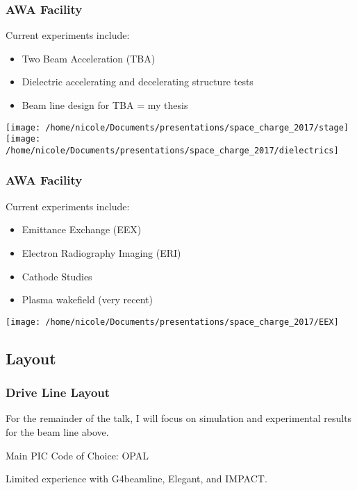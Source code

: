 \documentclass[professionalfonts,t]{beamer}
\begin{document}
\begin{frame}
\frametitle{AWA Facility}
Current experiments include:
\begin{itemize}
	\item{Two Beam Acceleration (TBA)}
	\item{Dielectric accelerating and decelerating structure tests}
	\item{Beam line design for TBA = my thesis}
\end{itemize}
\vspace{0.5cm}
\texttt{[image: /home/nicole/Documents/presentations/space\_charge\_2017/stage]}\hfill\texttt{[image: /home/nicole/Documents/presentations/space\_charge\_2017/dielectrics]}

\end{frame}

\begin{frame}
\frametitle{AWA Facility}
Current experiments include:
\begin{itemize}
\item{Emittance Exchange (EEX)}
\item{Electron Radiography Imaging (ERI)}
\item{Cathode Studies}
\item Plasma wakefield (very recent)
\end{itemize}
\vspace{0.3cm}
\centering
\texttt{[image: /home/nicole/Documents/presentations/space\_charge\_2017/EEX]}
\end{frame}

\subsection{Layout}
\begin{frame}
\frametitle{Drive Line Layout}
\begin{tikzpicture}[scale=\textwidth/20cm, text=black]

\end{tikzpicture}

For the remainder of the talk, I will focus on simulation and experimental results for the beam line above.

\vspace{1em}

Main PIC Code of Choice: OPAL

\vspace{1em}

Limited experience with G4beamline, Elegant, and IMPACT.

\end{frame}
\end{document}
